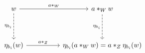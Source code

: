 \[\begin{tikzcd}
	w && {a *_{W} w} \\
	\\
	{\eta_{b_{i}}(w)} && {\eta_{b_{i}}(a *_{W} w) = a *_{Z} \eta_{b_{i}}(w)}
	\arrow["{\eta_{b_{i}}}"', dashed, from=1-1, to=3-1]
	\arrow["{a *_{W}}", from=1-1, to=1-3]
	\arrow["{a *_{Z}}", from=3-1, to=3-3]
	\arrow["{\eta_{b_{i}}}"', dashed, from=1-3, to=3-3]
\end{tikzcd}\]